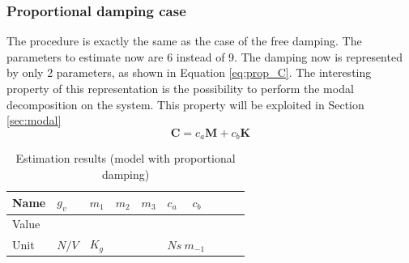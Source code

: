 \documentclass[twosided,a4paper]{article}           %
\begin{document}
\subsubsection{Proportional damping case}
The procedure is exactly the same as the case of the free damping. The parameters to estimate now are 6 instead of 9. The damping now is represented by only 2 parameters, as shown in Equation \eqref{eq:prop_C}. The interesting property of this representation is the possibility to perform the modal decomposition on the system. This property will be exploited in Section \ref{sec:modal}
\begin{equation}
	\label{eq:prop_C}
	\bm{C} = c_a\bm{M} + c_b\bm{K}
\end{equation}
\begin{table}[H]
	\centering
	\begin{tabular}{|l|l|l|l|l|l|l|l|l|l|}
		\hline
		Name & $g_v$ &  $m_1$ & $m_2$ & $m_3$  &  $c_a$ & $c_b$  \\
		\hline
		Value &  &  &  &  &  &  \\ 
		\hline
		Unit & $N/V$ &  \multicolumn{3}{l|}{$K_g$}  &  \multicolumn{2}{l|}{$Ns \ m_{-1}$} \\
		\hline
	\end{tabular}
	\caption{Estimation results (model with proportional damping)}
	\label{tab:est_prop_results}
\end{table}
\end{document}
